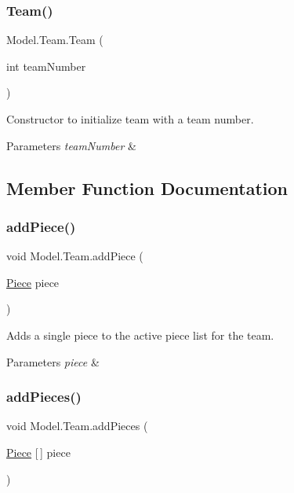 \subsubsection{\texorpdfstring{Team()}{Team()}}
{\footnotesize\ttfamily Model.\+Team.\+Team (\begin{DoxyParamCaption}\item[{int}]{team\+Number }\end{DoxyParamCaption})}

Constructor to initialize team with a team number. 
\begin{DoxyParams}{Parameters}
{\em team\+Number} & \\
\hline
\end{DoxyParams}


\subsection{Member Function Documentation}
\hypertarget{class_model_1_1_team_ab9243a9d3a778a57d4d25c9238b069f7}{}\label{class_model_1_1_team_ab9243a9d3a778a57d4d25c9238b069f7} 
\subsubsection{\texorpdfstring{add\+Piece()}{addPiece()}}
{\footnotesize\ttfamily void Model.\+Team.\+add\+Piece (\begin{DoxyParamCaption}\item[{\hyperlink{class_model_1_1_pieces_1_1_piece}{Piece}}]{piece }\end{DoxyParamCaption})}

Adds a single piece to the active piece list for the team. 
\begin{DoxyParams}{Parameters}
{\em piece} & \\
\hline
\end{DoxyParams}
\hypertarget{class_model_1_1_team_ae29f91cb29d72c68f8e1d97b08d86eb4}{}\label{class_model_1_1_team_ae29f91cb29d72c68f8e1d97b08d86eb4} 
\subsubsection{\texorpdfstring{add\+Pieces()}{addPieces()}}
{\footnotesize\ttfamily void Model.\+Team.\+add\+Pieces (\begin{DoxyParamCaption}\item[{\hyperlink{class_model_1_1_pieces_1_1_piece}{Piece} \mbox{[}$\,$\mbox{]}}]{piece }\end{DoxyParamCaption})}

